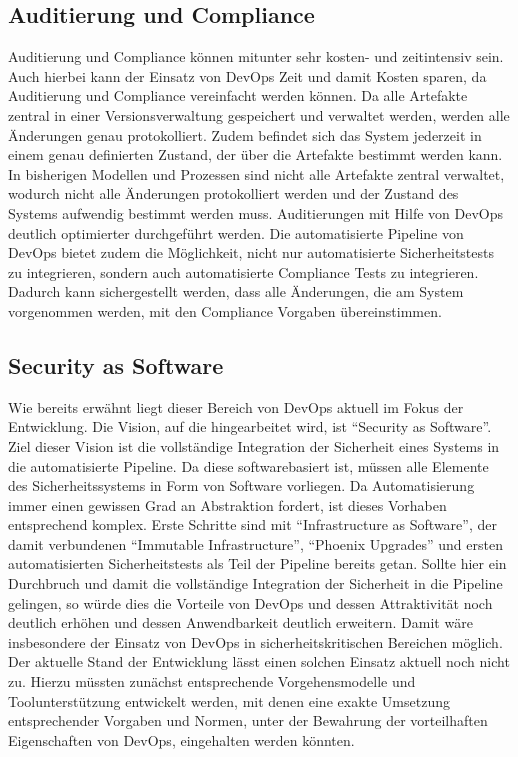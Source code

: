 \subsection{Auditierung und Compliance}
Auditierung und Compliance können mitunter sehr kosten- und zeitintensiv sein. Auch hierbei kann der Einsatz von DevOps Zeit und damit Kosten sparen, da Auditierung und Compliance vereinfacht werden können. 
Da alle Artefakte zentral in einer Versionsverwaltung gespeichert und verwaltet werden, werden alle Änderungen genau protokolliert. 
Zudem befindet sich das System jederzeit in einem genau definierten Zustand, der über die Artefakte bestimmt werden kann. 
In bisherigen Modellen und Prozessen sind nicht alle Artefakte zentral verwaltet, wodurch nicht alle Änderungen protokolliert werden und der Zustand des Systems aufwendig bestimmt werden muss. 
Auditierungen mit Hilfe von DevOps deutlich optimierter durchgeführt werden. 
Die automatisierte Pipeline von DevOps bietet zudem die Möglichkeit, nicht nur automatisierte Sicherheitstests zu integrieren, sondern auch automatisierte Compliance Tests zu integrieren. 
Dadurch kann sichergestellt werden, dass alle Änderungen, die am System vorgenommen werden, mit den Compliance Vorgaben übereinstimmen.

\subsection{Security as Software}
Wie bereits erwähnt liegt dieser Bereich von DevOps aktuell im Fokus der Entwicklung. 
Die Vision, auf die hingearbeitet wird, ist \enquote{Security as Software}. 
Ziel dieser Vision ist die vollständige Integration der Sicherheit eines Systems in die automatisierte Pipeline. 
Da diese softwarebasiert ist, müssen alle Elemente des Sicherheitssystems in Form von Software vorliegen. 
Da Automatisierung immer einen gewissen Grad an Abstraktion fordert, ist dieses Vorhaben entsprechend komplex. 
Erste Schritte sind mit \enquote{Infrastructure as Software}, der damit verbundenen \enquote{Immutable Infrastructure}, \enquote{Phoenix Upgrades} und ersten automatisierten Sicherheitstests als Teil der Pipeline bereits getan. 
Sollte hier ein Durchbruch und damit die vollständige Integration der Sicherheit in die Pipeline gelingen, so würde dies die Vorteile von DevOps und dessen Attraktivität noch deutlich erhöhen und dessen Anwendbarkeit deutlich erweitern.
Damit wäre insbesondere der Einsatz von DevOps in sicherheitskritischen Bereichen möglich. 
Der aktuelle Stand der Entwicklung lässt einen solchen Einsatz aktuell noch nicht zu. 
Hierzu müssten zunächst entsprechende Vorgehensmodelle und Toolunterstützung entwickelt werden, mit denen eine exakte Umsetzung entsprechender Vorgaben und Normen, unter der Bewahrung der vorteilhaften Eigenschaften von DevOps, eingehalten werden könnten.

